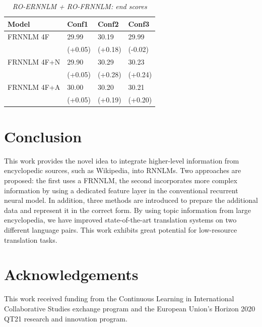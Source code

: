 \documentclass[a4paper]{article}
\begin{document}
\begin{table}
\caption{\it RO-ERNNLM + RO-FRNNLM: end scores}
\vspace{2mm}
\centering
  \begin{tabular}{llll}
  	\hline
  	Model       & Conf1   & Conf2   & Conf3   \\ \hline\hline
  	FRNNLM 4F   & 29.99   & 30.19   & 29.99   \\
  	            & (+0.05) & (+0.18) & (-0.02) \\
  	FRNNLM 4F+N & 29.90   & 30.29   & 30.23   \\
  	            & (+0.05) & (+0.28) & (+0.24) \\
  	FRNNLM 4F+A & 30.00   & 30.20   & 30.21   \\
  	            & (+0.05) & (+0.19) & (+0.20)
  \end{tabular}
  \label{tb:ro-extended}
\end{table}


\section{Conclusion}
This work provides the novel idea to integrate higher-level information from encyclopedic sources, such as Wikipedia, into RNNLMs. Two approaches are proposed: the first uses a FRNNLM, the second incorporates more complex information by using a dedicated feature layer in the conventional recurrent neural model. In addition, three methods are introduced to prepare the additional data and represent it in the correct form.
By using topic information from large encyclopedia, we have improved state-of-the-art translation systems on two different language pairs.  
This work exhibits great potential for low-resource translation tasks. 



\section{Acknowledgements}
This work received funding from the Continuous Learning in International Collaborative Studies exchange program and the European Union’s Horizon 2020 QT21 research and innovation program.
\end{document}
